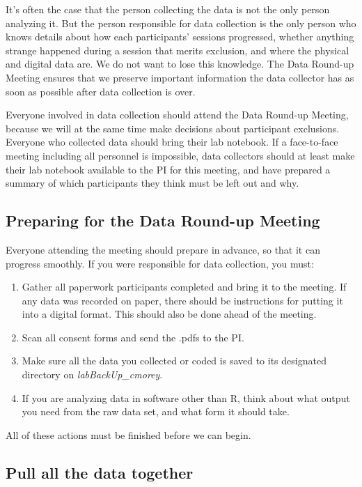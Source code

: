 \documentclass[
  12pt,
]{book}
\providecommand{\tightlist}{%
  \setlength{\itemsep}{0pt}\setlength{\parskip}{0pt}}
\begin{document}
It's often the case that the person collecting the data is not the only person analyzing it. But the person responsible for data collection is the only person who knows details about how each participants' sessions progressed, whether anything strange happened during a session that merits exclusion, and where the physical and digital data are. We do not want to lose this knowledge. The Data Round-up Meeting ensures that we preserve important information the data collector has as soon as possible after data collection is over.

Everyone involved in data collection should attend the Data Round-up Meeting, because we will at the same time make decisions about participant exclusions. Everyone who collected data should bring their lab notebook. If a face-to-face meeting including all personnel is impossible, data collectors should at least make their lab notebook available to the PI for this meeting, and have prepared a summary of which participants they think must be left out and why.

\subsection{Preparing for the Data Round-up Meeting}\label{preparing-for-the-data-round-up-meeting}

Everyone attending the meeting should prepare in advance, so that it can progress smoothly. If you were responsible for data collection, you must:

\begin{enumerate}
\def\labelenumi{\arabic{enumi}.}
\tightlist
\item
  Gather all paperwork participants completed and bring it to the meeting. If any data was recorded on paper, there should be instructions for putting it into a digital format. This should also be done ahead of the meeting.
\item
  Scan all consent forms and send the .pdfs to the PI.
\item
  Make sure all the data you collected or coded is saved to its designated directory on \emph{labBackUp\_cmorey}.
\item
  If you are analyzing data in software other than R, think about what output you need from the raw data set, and what form it should take.
\end{enumerate}

All of these actions must be finished before we can begin.

\subsection{Pull all the data together}\label{pull-all-the-data-together}
\end{document}

